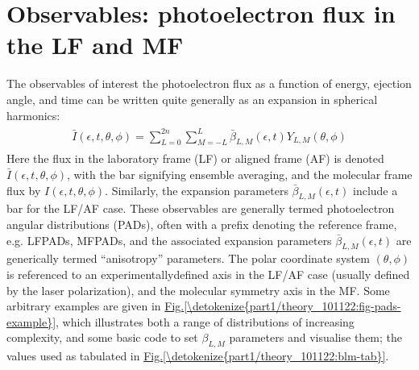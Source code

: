 \documentclass[letterpaper,10pt,english]{jupyterBook}
\begin{document}
\section{Observables: photoelectron flux in the LF and MF}
\label{\detokenize{part1/theory_101122:observables-photoelectron-flux-in-the-lf-and-mf}}\label{\detokenize{part1/theory_101122:sect-theory-observables}}
\sphinxAtStartPar
The observables of interest \sphinxhyphen{} the photoelectron flux as a function of energy, ejection angle, and time \sphinxhyphen{} can be written quite generally as an expansion in spherical harmonics:
\begin{equation}\label{equation:part1/theory_101122:eq:AF-PAD-general}
\begin{split}
\begin{align}
\bar{I}(\epsilon,t,\theta,\phi)=\sum_{L=0}^{2n}\sum_{M=-L}^{L}\bar{\beta}_{L,M}(\epsilon,t)Y_{L,M}(\theta,\phi)
\end{align}
\end{split}
\end{equation}
\sphinxAtStartPar
Here the flux in the laboratory frame (LF) or aligned frame (AF) is denoted \(\bar{I}(\epsilon,t,\theta,\phi)\), with the bar signifying ensemble averaging, and the molecular frame flux by \(I(\epsilon,t,\theta,\phi)\). Similarly, the expansion parameters \(\bar{\beta}_{L,M}(\epsilon,t)\) include a bar for the LF/AF case. These observables are generally termed photoelectron angular distributions (PADs), often with a prefix denoting the reference frame, e.g. LFPADs, MFPADs, and the associated expansion parameters \(\bar{\beta}_{L,M}(\epsilon,t)\) are generically termed “anisotropy” parameters. The polar coordinate system \((\theta,\phi)\) is referenced to
an experimentally\sphinxhyphen{}defined axis in the LF/AF case (usually defined by the laser polarization), and the molecular symmetry axis in the MF. Some arbitrary examples are given in \hyperref[\detokenize{part1/theory_101122:fig-pads-example}]{Fig.\@ \ref{\detokenize{part1/theory_101122:fig-pads-example}}}, which illustrates both a range of distributions of increasing complexity, and some basic code to set \(\beta_{L,M}\) parameters and visualise them; the values used as tabulated in  \hyperref[\detokenize{part1/theory_101122:blm-tab}]{Fig.\@ \ref{\detokenize{part1/theory_101122:blm-tab}}}.
\end{document}
